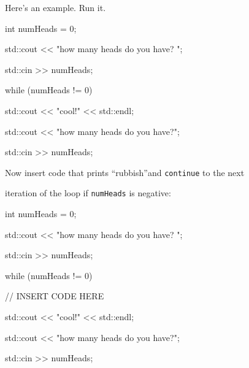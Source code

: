 Here's an example. Run it.

\begin{console}

int numHeads = 0;

std::cout << "how many heads do you have? ";

std::cin >> numHeads;

while (numHeads != 0)

{     

      std::cout << "cool!" << std::endl;

      std::cout << "how many heads do you have?";

      std::cin >> numHeads;

}

\end{console}



Now insert code that prints ``rubbish''and \texttt{continue} to the next

iteration of the loop if \texttt{numHeads} is negative:

\begin{console}

int numHeads = 0;

std::cout << "how many heads do you have? ";

std::cin >> numHeads;

while (numHeads != 0)

{     

      // INSERT CODE HERE

      std::cout << "cool!" << std::endl;

      std::cout << "how many heads do you have?";

      std::cin >> numHeads;

}

\end{console}

